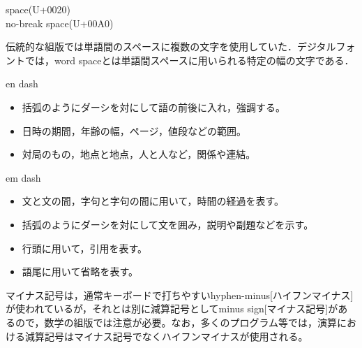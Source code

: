 \begin{description}
    \item[space(U+0020)]
    \item[no-break space(U+00A0)]
\end{description}

伝統的な組版では単語間のスペースに複数の文字を使用していた．デジタルフォントでは，word spaceとは単語間スペースに用いられる特定の幅の文字である\cite{docs.microsoft.com:en-us/typography/develop/character-design-standards/whitespace}．

en dash\cite{handbook_of_typography}

\begin{itemize}
    \item 括弧のようにダーシを対にして語の前後に入れ，強調する。
    \item 日時の期間，年齢の幅，ページ，値段などの範囲。
    \item 対局のもの，地点と地点，人と人など，関係や連結。
\end{itemize}

em dash\cite{handbook_of_typography}

\begin{itemize}
    \item 文と文の間，字句と字句の間に用いて，時間の経過を表す。
    \item 括弧のようにダーシを対にして文を囲み，説明や副題などを示す。
    \item 行頭に用いて，引用を表す。
    \item 語尾に用いて省略を表す。
\end{itemize}

マイナス記号は，通常キーボードで打ちやすいhyphen-minus[ハイフンマイナス]が使われているが，それとは別に減算記号としてminus sign[マイナス記号]があるので，数学の組版では注意が必要。なお，多くのプログラム等では，演算における減算記号はマイナス記号でなくハイフンマイナスが使用される\cite{handbook_of_typography}。
